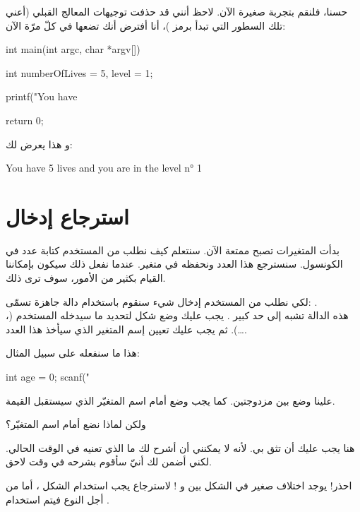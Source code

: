 حسنا، فلنقم بتجربة صغيرة الآن. لاحظ أنني قد حذفت توجيهات المعالج القبلي (أعني تلك السطور التي تبدأ برمز
\InlineCode{\#})،
أنا أفترض أنك تضعها في كلّ مرّة الآن:

\begin{Csource}
int main(int argc, char *argv[])
{
  int numberOfLives = 5, level = 1;

  printf("You have %

  return 0;
}
\end{Csource}

و هذا يعرض لك:

\begin{Console}
You have 5 lives and you are in the level n° 1
\end{Console}

\section{استرجاع إدخال}

بدأت المتغيرات تصبح ممتعة الآن. سنتعلم كيف نطلب من المستخدم كتابة عدد في الكونسول. سنسترجع هذا العدد ونحفظه في متغير. عندما نفعل ذلك سيكون بإمكاننا القيام بكثير من الأمور، سوف ترى ذلك.

لكي نطلب من المستخدم إدخال شيء سنقوم باستخدام دالة جاهزة تسمّى:
.\\
هذه الدالة تشبه إلى حد كبير
.
يجب عليك وضع شكل لتحديد ما سيدخله المستخدم
(، \dots).
ثم يجب عليك تعيين إسم المتغير الذي سيأخذ هذا العدد.

هذا ما سنفعله على سبيل المثال:

\begin{Csource}
int age = 0;
scanf("%
\end{Csource}

علينا وضع
بين مزدوجتين. كما يجب وضع
\InlineCode{\&}
أمام اسم المتغيّر الذي سيستقبل القيمة.

\begin{question}
  ولكن لماذا نضع
\InlineCode{\&}
أمام اسم المتغيّر؟
\end{question}

هنا يجب عليك أن تثق بي. لأنه لا يمكنني أن أشرح لك ما الذي تعنيه في الوقت الحالي. لكني أضمن لك أنيّ سأقوم بشرحه في وقت لاحق.

\begin{critical}
احذر! يوجد اختلاف صغير في الشكل بين
و
 ! لاسترجاع
يجب استخدام الشكل
،
أما من أجل النوع
 فيتم استخدام
.
\end{critical}

